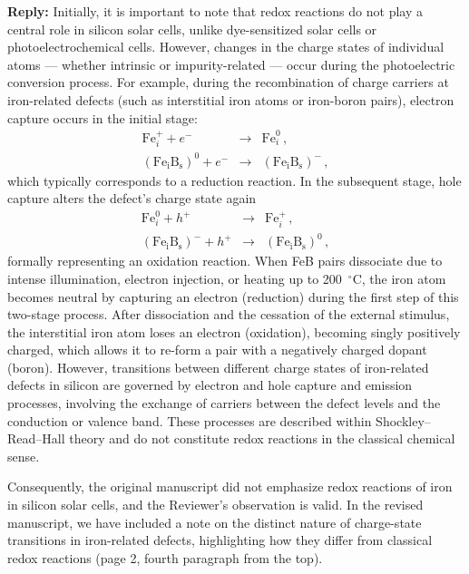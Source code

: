 \documentclass[a4paper,fleqn]{cas-sc}
\begin{document}
\noindent
\textcolor[rgb]{0.51,0.00,0.00}{\textbf{Reply:}}
Initially, it is important to note that
redox reactions do not play a central role in silicon solar cells,
unlike dye-sensitized solar cells or photoelectrochemical cells.
However, changes in the charge states of individual atoms --- whether intrinsic or impurity-related ---
occur during the photoelectric conversion process.
For example, during the recombination of charge carriers at iron-related defects
(such as interstitial iron atoms or iron-boron pairs),
electron capture occurs in the initial stage:
\begin{eqnarray*}
  \mathrm{Fe}_i^++e^-&\rightarrow& \mathrm{Fe}_i^0\,, \\
  (\mathrm{Fe_iB_s})^0+e^-&\rightarrow& (\mathrm{Fe_iB_s})^-\,,
\end{eqnarray*}
which typically corresponds to a reduction reaction.
In the subsequent stage, hole capture alters the defect's charge state again
\begin{eqnarray*}
  \mathrm{Fe}_i^0+h^+&\rightarrow& \mathrm{Fe}_i^+\,, \\
  (\mathrm{Fe_iB_s})^-+h^+&\rightarrow& (\mathrm{Fe_iB_s})^0\,,
\end{eqnarray*}
formally representing an oxidation reaction.
When FeB pairs dissociate due to intense illumination, electron injection, or heating up to 200~$^\circ$C,
the iron atom becomes neutral by capturing an electron (reduction) during the first step of this two-stage process.
After dissociation and the cessation of the external stimulus,
the interstitial iron atom loses an electron (oxidation),
becoming singly positively charged, which allows it to re-form a pair with a negatively charged dopant (boron).
However, transitions between different charge states of iron-related defects in silicon
are governed by electron and hole capture and emission processes,
involving the exchange of carriers between the defect levels and the conduction or valence band.
These processes are described within Shockley–Read–Hall theory
and do not constitute redox reactions in the classical chemical sense.

Consequently, the original manuscript did not emphasize redox reactions of iron in silicon solar cells,
and the Reviewer’s observation is valid.
In the revised manuscript, we have included a note on the distinct nature of charge-state transitions in iron-related defects,
highlighting how they differ from classical redox reactions (page 2, fourth paragraph from the top).
\end{document}
